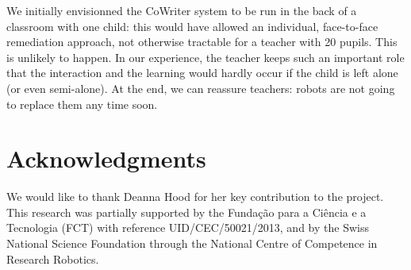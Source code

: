 \documentclass{article}
\begin{document}
We initially envisionned the CoWriter system to be run in the back of a
classroom with one child: this would have allowed an individual, face-to-face
remediation approach, not otherwise tractable for a teacher with 20 pupils.
This is unlikely to happen. In our experience, the teacher keeps such an
important role that the interaction and the learning would hardly occur if the
child is left alone (or even semi-alone). At the end, we can reassure teachers:
robots are not going to replace them any time soon.

\section*{Acknowledgments}

We would like to thank Deanna Hood for her key contribution to the project.
This research was partially supported by the Funda\c{c}\~{a}o para a Ci\^{e}ncia
e a Tecnologia (FCT) with reference UID/CEC/50021/2013, and by the Swiss
National Science Foundation through the National Centre of Competence in
Research Robotics.



\end{document}
